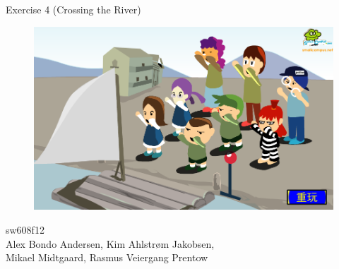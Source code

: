 \begin{center}
\huge{Exercise 4 (Crossing the River)}

\begin{figure}[H]%
\includegraphics[width=\columnwidth]{pictures/front.png}%
\end{figure}

\large{sw608f12} \\

\large{Alex Bondo Andersen, Kim Ahlstrøm Jakobsen,\\Mikael Midtgaard, Rasmus Veiergang Prentow}
\end{center}